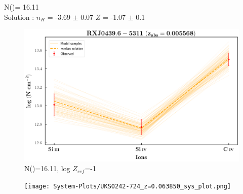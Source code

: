 \documentclass[12pt]{report}
\newcommand\ion[2]{\text{#1\,\textsc{\lowercase{#2}}}}
\begin{document}
N(\ion{H}{I})= 16.11  \\ 

Solution : $n_H$ = -3.69 $\pm$ 0.07 \hspace{10mm} $Z$ = -1.07 $\pm$ 0.1 \newline


\begin{figure}[!htbp]
    \centering
    \includegraphics[width=1\linewidth]{Ionisation-Modelling-Plots/rxj0439-z=0.005568-compII_logZ=-1.png}
    \caption{N(\ion{H}{i})=16.11, log $Z_{ref}$=-1}
\end{figure}



\newpage

\begin{landscape}

\begin{figure}
    \centering
    \vspace{-20mm}
    \hspace*{-35mm}
    \texttt{[image: System-Plots/UKS0242-724\_z=0.063850\_sys\_plot.png]}
\end{figure}

\end{landscape}
\end{document}

